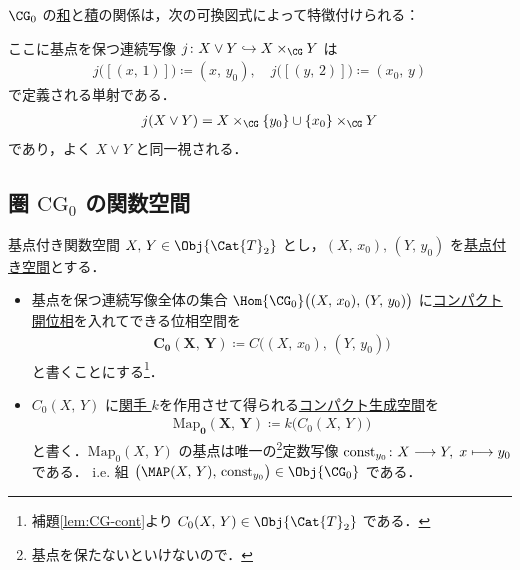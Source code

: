 \documentclass[algtopo_main]{subfiles}
\begin{document}
$\CG_0$ の\hyperref[prop:CG0-sum]{和}と\hyperref[prop:CG0-product]{積}の関係は，次の可換図式によって特徴付けられる：
\begin{center}
\end{center}
ここに基点を保つ連続写像 $j \colon X \vee Y \hookrightarrow X \times_{\CG} Y$ は
\begin{align}
    j\bigl([(x,\, 1)]\bigr) \coloneqq (x,\, y_0),\quad j\bigl([(y,\, 2)]\bigr) \coloneqq (x_0,\, y)
\end{align}
で定義される単射である．
\begin{align}
    j(X \vee Y) = X \times_{\CG} \{y_0\} \cup \{x_0\} \times_{\CG} Y
\end{align}
であり，よく $X \vee Y$ と同一視される．

\subsection{圏 $\mathrm{CG}_0$ の関数空間}

\begin{mydef}[label=def:CG0-Map, breakable]{基点付き関数空間}
    $X,\, Y \in \Obj{\Cat{T}_2}$ とし，$(X,\, x_0),\, (Y,\, y_0)$ を\hyperref[def:bases-space]{基点付き空間}とする．
    \begin{itemize}
        \item 基点を保つ連続写像全体の集合 $\Hom{\CG_0} \bigl( (X,\, x_0),\, (Y,\, y_0) \bigr)$ に\hyperref[def:compact-open]{コンパクト開位相}を入れてできる位相空間を 
        \begin{align}
            \bm{C_0 (X,\, Y)} \coloneqq C \bigl( (X,\, x_0),\, (Y,\, y_0) \bigr)
        \end{align}
        と書くことにする\footnote{補題\ref{lem:CG-cont}より $C_0(X,\, Y) \in \Obj{\Cat{T}_2}$ である．}．
        \item $C_0(X,\, Y)$ に\hyperref[def:k-functor]{関手 $k$}を作用させて得られる\hyperref[def:CG]{コンパクト生成空間}を
        \begin{align}
            \bm{\mathrm{Map}_0(X,\, Y)} \coloneqq k \bigl( C_0(X,\, Y) \bigr) 
        \end{align}
        と書く．$\mathrm{Map}_0(X,\, Y)$ の基点は唯一の\footnote{基点を保たないといけないので．}定数写像 $\mathrm{const}_{y_0} \colon X \longrightarrow Y,\; x \longmapsto y_0$ である．
        i.e. 組 $\bigl( \MAP(X,\, Y),\, \mathrm{const}_{y_0} \bigr) \in \Obj{\CG_0}$ である．
    \end{itemize}
\end{mydef}
\end{document}
